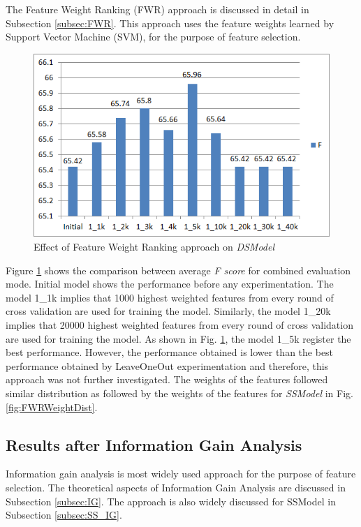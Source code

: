 The Feature Weight Ranking (FWR) approach is discussed in detail in Subsection \ref{subsec:FWR}. This approach uses the feature weights learned by Support Vector Machine (SVM), for the purpose of feature selection.

\begin{figure}
\centering
\includegraphics[scale=0.7]{figures/DSFWRResults.png}
\caption{Effect of Feature Weight Ranking approach on \textit{DSModel}}\label{fig:DSFWR}
\end{figure}

Figure \ref{fig:DSFWR} shows the comparison between average \textit{F score} for combined evaluation mode. Initial model shows the performance before any experimentation. The model 1\_1k implies that 1000 highest weighted features from every round of cross validation are used for training the model. Similarly, the model 1\_20k implies that 20000 highest weighted features from every round of cross validation are used for training the model. As shown in Fig. \ref{fig:DSFWR}, the model 1\_5k register the best performance. However, the performance obtained is lower than the best performance obtained by LeaveOneOut experimentation and therefore, this approach was not further investigated. The weights of the features followed similar distribution as followed by the weights of the features for \textit{SSModel} in Fig. \ref{fig:FWRWeightDist}.

\subsection{Results after Information Gain Analysis}


Information gain analysis is most widely used approach for the purpose of feature selection. The theoretical aspects of Information Gain Analysis are discussed in Subsection \ref{subsec:IG}. The approach is also widely discussed for SSModel in Subsection \ref{subsec:SS_IG}.

